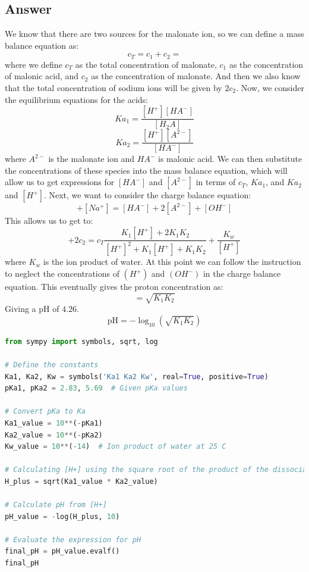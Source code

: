 \documentclass[12pt]{article}
\begin{document}
\subsection{Answer}
We know that there are two sources for the malonate ion, so we can define a mass balance equation as:
\begin{equation}
  c_{T}=c_1+c_2
=\end{equation}
where we define $c_{T}$ as the total concentration of malonate, $c_1$ as the concentration of malonic acid, and $c_2$ as the concentration of malonate. 
And then we also know that the total concentration of sodium ions will be given by $2c_2$. Now, we consider the equilibrium equations for the acids:
\begin{equation}
  Ka_{1}=\frac{[H^{+}][HA^{-}]}{[H_2A]}
\end{equation}
\begin{equation}
  Ka_{2}=\frac{[H^{+}][A^{2-}]}{[HA^{-}]}
\end{equation}
where $A^{2-}$ is the malonate ion and $HA^{-}$ is malonic acid.
We can then substitute the concentrations of these species into the mass balance equation, which will allow us to get expressions for $[HA^{-}]$ and $[A^{2-}]$ in terms of $c_{T}$, $Ka_{1}$, and $Ka_{2}$ and $[H^{+}]$. Next, we want to consider the charge balance equation:
\begin{equation}
  [H^{+}] + [Na^{+}] = [HA^{-}] + 2[A^{2-}] + [OH^{-}]
\end{equation}
This allows us to get to:
\begin{equation}
[H^+]+2 c_2=c_T \frac{K_1[H^+]+2 K_1 K_2}{[H^+]^2+K_1[H^+]+K_1 K_2}+\frac{K_w}{[H^+]}
\end{equation}
where $K_w$ is the ion product of water. At this point we can follow the instruction to neglect the concentrations of $(H^{+})$ and $(OH^{-})$ in the charge balance equation. This eventually gives the proton concentration as:
\begin{equation}
[H^+]=\sqrt{K_1 K_2}
\end{equation}
Giving a $\mathrm{pH}$ of $4.26$.
\begin{equation}
\mathrm{pH}=-\log_{10}(\sqrt{K_1 K_2})
\end{equation}
\begin{lstlisting}[language=Python]
from sympy import symbols, sqrt, log

# Define the constants
Ka1, Ka2, Kw = symbols('Ka1 Ka2 Kw', real=True, positive=True)
pKa1, pKa2 = 2.83, 5.69  # Given pKa values

# Convert pKa to Ka
Ka1_value = 10**(-pKa1)
Ka2_value = 10**(-pKa2)
Kw_value = 10**(-14)  # Ion product of water at 25 C

# Calculating [H+] using the square root of the product of the dissociation constants
H_plus = sqrt(Ka1_value * Ka2_value)

# Calculate pH from [H+]
pH_value = -log(H_plus, 10)

# Evaluate the expression for pH
final_pH = pH_value.evalf()
final_pH

\end{lstlisting}
\end{document}
